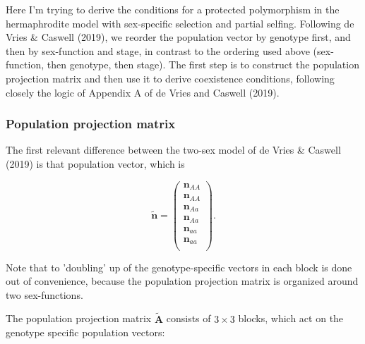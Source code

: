 \documentclass[11pt]{article}
\def\mbf#1{\mathbf{#1}}
\begin{document}
Here I'm trying to derive the conditions for a protected polymorphism in the hermaphrodite model with sex-specific selection and partial selfing. Following de Vries \& Caswell (2019), we reorder the population vector by genotype first, and then by sex-function and stage, in contrast to the ordering used above (sex-function, then genotype, then stage). The first step is to construct the population projection matrix and then use it to derive coexistence conditions, following closely the logic of Appendix A of de Vries and Caswell (2019).

\subsubsection*{Population projection matrix}

The first relevant difference between the two-sex model of de Vries \& Caswell (2019) is that population vector, which is 

\begin{equation}
	\tilde{\mbf{n}} = \left(
			\begin{array}{c}
							\mbf{n}_{AA} \\
							\mbf{n}_{AA} \\ \hline
							\mbf{n}_{Aa} \\
							\mbf{n}_{Aa} \\ \hline
							\mbf{n}_{aa} \\
							\mbf{n}_{aa} \\
			\end{array} \right).
\end{equation}

\noindent Note that to 'doubling' up of the genotype-specific vectors in each block is done out of convenience, because the population projection matrix is organized around two sex-functions.

The population projection matrix $\tilde{\mbf{A}}$ consists of $3 \times 3$ blocks, which act on the genotype specific population vectors:
\end{document}

